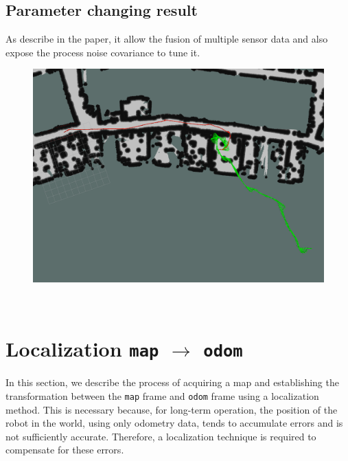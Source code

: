 \subsection{\alert{Parameter changing result}}
\alert{
As describe in the paper, it allow the fusion of multiple sensor data and also expose the process noise covariance to tune it.
}
\\
\begin{figure}[h]
	\centering
	\includegraphics[width=0.9\linewidth]{img/odom_wheel_filter.png}
\end{figure}\\


\section{Localization \texttt{map} $\rightarrow$ \texttt{odom}}
In this section, we describe the process of acquiring a map and establishing the transformation between the \texttt{map} frame and \texttt{odom} frame using a localization method. This is necessary because, for long-term operation, the position of the robot in the world, using only odometry data, tends to accumulate errors and is not sufficiently accurate. Therefore, a localization technique is required to compensate for these errors\cite{sh-p1-prelude}.
